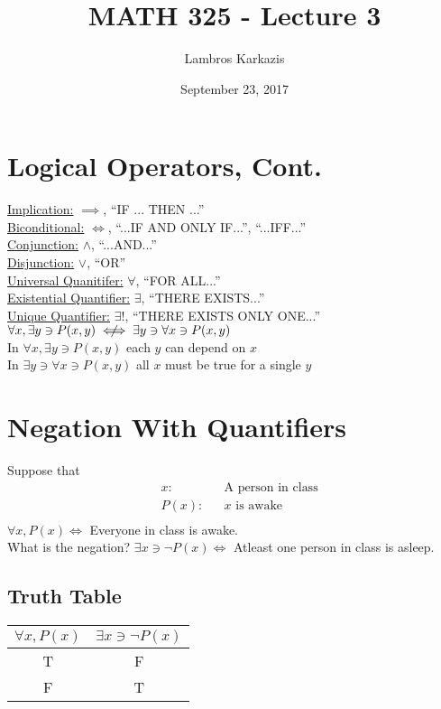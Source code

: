 \documentclass{article}
\title{MATH 325 - Lecture 3}
\author{Lambros Karkazis}
\date{September 23, 2017}
\newcommand{\notiff}{%
  \mathrel{{\ooalign{\hidewidth$\not\phantom{"}$\hidewidth\cr$\iff$}}}}
\begin{document}
\maketitle
\section{Logical Operators, Cont.}
\underline{Implication:} $\implies$, ``IF ... THEN ...''\\
\underline{Biconditional:} $\iff$, ``...IF AND ONLY IF...'', ``...IFF...''\\
\underline{Conjunction:} $\wedge$, ``...AND...''\\
\underline{Disjunction:} $\vee$, ``OR''\\
\underline{Universal Quanitifer:} $\forall$, ``FOR ALL...''\\
\underline{Existential Quantifier:} $\exists$, ``THERE EXISTS...''\\
\underline{Unique Quantifier:} $\exists !$, ``THERE EXISTS ONLY ONE...''\\

$\forall x, \exists y \ni P(x,y) \notiff \exists y \ni \forall x \ni P(x,y)$\\
In $\forall x, \exists y \ni P(x,y)$ each $y$ can depend on $x$\\
In $\exists y \ni \forall x \ni P(x,y)$ all $x$ must be true for a single $y$\\

\section{Negation With Quantifiers}
Suppose that
\begin{align*}
	& x: && \text{A person in class}\\
	& P(x): && x \text{ is awake}\\
\end{align*}
$\forall x, P(x) \iff$ Everyone in class is awake.\\
What is the negation?
$\exists x \ni \neg P(x) \iff$ Atleast one person in class is asleep.\\
\subsection{Truth Table}
\begin{center}
        \begin{tabular}{|| c | c ||} 
        \hline\hline
        $\forall x, P(x)$ & $\exists x \ni \neg P(x)$\\ [0.5ex] 
        \hline\hline
       T & F\\ 
        \hline
        F & T\\
        \hline\hline
        \end{tabular}
\end{center}
\end{document}
